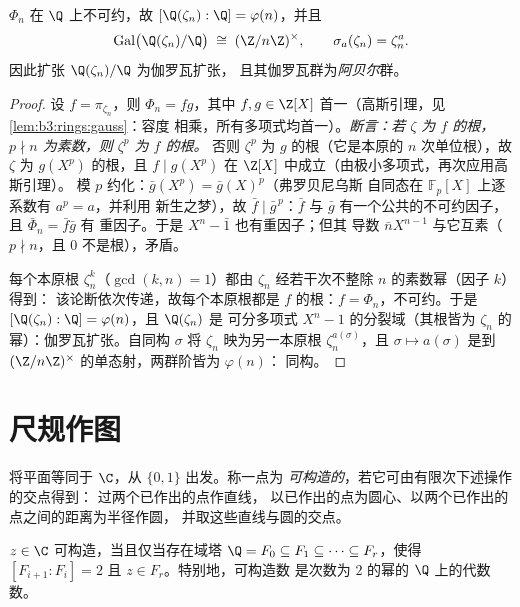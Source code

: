 \begin{theorem}\label{thm:b3:galois:cyclotomicirred}
$\Phi_n$ 在 $\Q$ 上不可约，故 $[\Q(\zeta_n) : \Q] =
\varphi(n)$，并且
\[
\operatorname{Gal}\bigl(\Q(\zeta_n)/\Q\bigr) \;\cong\;
(\Z/n\Z)^\times,
\qquad \sigma_a(\zeta_n) = \zeta_n^a .
\]
因此扩张 $\Q(\zeta_n)/\Q$ 为伽罗瓦扩张，
且其伽罗瓦群为\emph{阿贝尔}群。
\end{theorem}

\begin{proof}
设 $f = \pi_{\zeta_n}$，则 $\Phi_n = fg$，其中 $f, g \in \Z[X]$
首一（高斯引理，见\cref{lem:b3:rings:gauss}：容度
相乘，所有多项式均首一）。\emph{断言：若 $\zeta$ 为
$f$ 的根，$p \nmid n$ 为素数，则 $\zeta^p$ 为
$f$ 的根。} 否则 $\zeta^p$ 为 $g$ 的根（它是本原的
$n$ 次单位根），故 $\zeta$ 为 $g(X^p)$ 的根，且 $f
\mid g(X^p)$ 在 $\Z[X]$ 中成立（由极小多项式，再次应用高斯引理）。
模 $p$ 约化：$\bar g(X^p) = \bar g(X)^p$（弗罗贝尼乌斯
自同态在 $\mathbb F_p[X]$ 上逐系数有 $a^p = a$，并利用
新生之梦），故 $\bar f \mid \bar g^{\,p}$：$\bar f$ 与 $\bar g$
有一个公共的不可约因子，且 $\bar\Phi_n = \bar f\bar g$ 有
重因子。于是 $X^n - \bar 1$ 也有重因子；但其
导数 $\bar nX^{n-1}$ 与它互素（$p \nmid n$，且
$0$ 不是根），矛盾。

每个本原根 $\zeta_n^k$（$\gcd(k, n) = 1$）都由
$\zeta_n$ 经若干次不整除 $n$ 的素数幂（因子 $k$）得到：
该论断依次传递，故每个本原根都是
$f$ 的根：$f = \Phi_n$，不可约。于是
$[\Q(\zeta_n):\Q] = \varphi(n)$，且 $\Q(\zeta_n)$ 是
可分多项式 $X^n - 1$ 的分裂域（其根皆为
$\zeta_n$ 的幂）：伽罗瓦扩张。自同构 $\sigma$ 将 $\zeta_n$
映为另一本原根 $\zeta_n^{a(\sigma)}$，且 $\sigma
\mapsto a(\sigma)$ 是到
$(\Z/n\Z)^\times$ 的单态射，两群阶皆为 $\varphi(n)$：
同构。
\end{proof}

\section{尺规作图}

\begin{definition}\label{def:b3:galois:constructible}
将平面等同于 $\C$，从 $\{0, 1\}$ 出发。称一点为
\emph{可构造的}，若它可由有限次下述操作的交点得到：
过两个已作出的点作直线，
以已作出的点为圆心、以两个已作出的点之间的距离为半径作圆，
并取这些直线与圆的交点。
\end{definition}

\begin{theorem}[万策尔]\label{thm:b3:galois:wantzel}
$z \in \C$ 可构造，当且仅当存在域塔 $\Q = F_0
\subseteq F_1 \subseteq \dots \subseteq F_r$，使得 $[F_{i+1} :
F_i] = 2$ 且 $z \in F_r$。特别地，可构造数
是次数为 $2$ 的幂的
$\Q$ 上的代数数。
\end{theorem}

